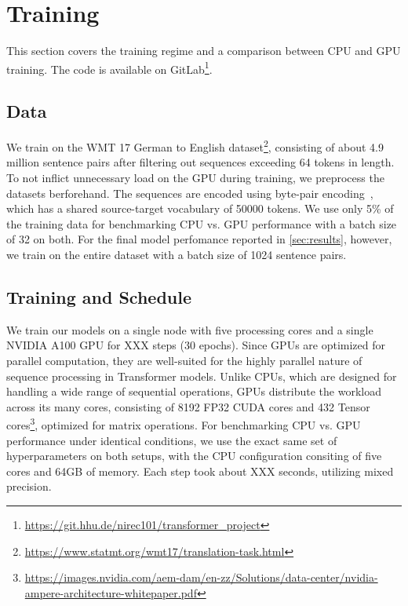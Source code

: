 \section{Training}
This section covers the training regime and a comparison between CPU and GPU training.
The code is available on GitLab\footnote{\url{https://git.hhu.de/nirec101/transformer_project}}.

\subsection{Data}
We train on the WMT 17 German to English dataset\footnote{\url{https://www.statmt.org/wmt17/translation-task.html}}, consisting of about 4.9 million sentence pairs after filtering out sequences exceeding 64 tokens in length.
To not inflict unnecessary load on the GPU during training, we preprocess the datasets berforehand.
The sequences are encoded using byte-pair encoding~\cite{britz2017massiveexplorationneuralmachine}, which has a shared source-target vocabulary of 50000 tokens.
We use only 5\% of the training data for benchmarking CPU vs. GPU performance with a batch size of 32 on both.
For the final model perfomance reported in \cref{sec:results}, however, we train on the entire dataset with a batch size of 1024 sentence pairs.

\subsection{Training and Schedule}
We train our models on a single node with five processing cores and a single NVIDIA A100 GPU for XXX steps (30 epochs).
Since GPUs are optimized for parallel computation, they are well-suited for the highly parallel nature of sequence processing in Transformer models.
Unlike CPUs, which are designed for handling a wide range of sequential operations, GPUs distribute the workload across its many cores, consisting of 8192 FP32 CUDA cores and 432 Tensor cores\footnote{\url{https://images.nvidia.com/aem-dam/en-zz/Solutions/data-center/nvidia-ampere-architecture-whitepaper.pdf}}, optimized for matrix operations.
For benchmarking CPU vs. GPU performance under identical conditions, we use the exact same set of hyperparameters on both setups, with the CPU configuration consiting of five cores and 64GB of memory.
Each step took about XXX seconds, utilizing mixed precision.


